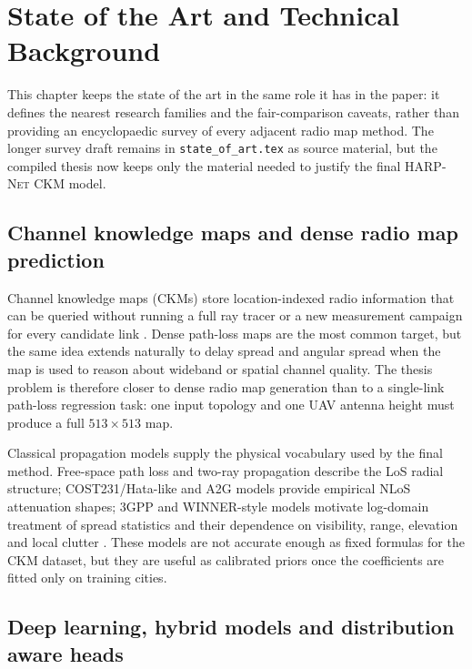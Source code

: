 \chapter[State of the Art]{State of the Art and Technical Background}

This chapter keeps the state of the art in the same role it has in the paper:
it defines the nearest research families and the fair-comparison caveats, rather
than providing an encyclopaedic survey of every adjacent radio map method. The
longer survey draft remains in \texttt{state\_of\_art.tex} as source material,
but the compiled thesis now keeps only the material needed to justify the final
\textsc{HARP-Net CKM} model.

\section{Channel knowledge maps and dense radio map prediction}
\label{sec:soa_ckm_context}

Channel knowledge maps (CKMs) store location-indexed radio information that can
be queried without running a full ray tracer or a new measurement campaign for
every candidate link \cite{zengx2021ckm}. Dense path-loss maps are the most
common target, but the same idea extends naturally to delay spread and angular
spread when the map is used to reason about wideband or spatial channel quality.
The thesis problem is therefore closer to dense radio map generation than to a
single-link path-loss regression task: one input topology and one UAV antenna
height must produce a full \(513\times513\) map.

Classical propagation models supply the physical vocabulary used by the final
method. Free-space path loss and two-ray propagation describe the LoS radial
structure; COST231/Hata-like and A2G models provide empirical NLoS attenuation
shapes; 3GPP and WINNER-style models motivate log-domain treatment of spread
statistics and their dependence on visibility, range, elevation and local
clutter \cite{rappaport,goldsmith,cost231,alhourani2014,tr38901,winner2}.
These models are not accurate enough as fixed formulas for the CKM dataset, but
they are useful as calibrated priors once the coefficients are fitted only on
training cities.

\section{Deep learning, hybrid models and distribution aware heads}
\label{sec:soa_dl}

